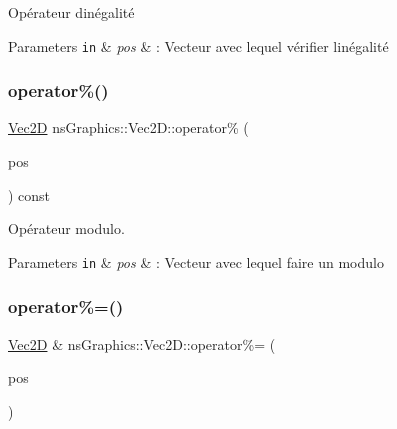 Opérateur d\textquotesingle{}inégalité 


\begin{DoxyParams}[1]{Parameters}
\mbox{\tt in}  & {\em pos} & \+: Vecteur avec lequel vérifier l\textquotesingle{}inégalité \\
\hline
\end{DoxyParams}
\mbox{\label{classns_graphics_1_1_vec2_d_a43281403abbad9948eacca4d37fc61dc}} 
\subsubsection{\texorpdfstring{operator\%()}{operator\%()}}
{\footnotesize\ttfamily \hyperlink{classns_graphics_1_1_vec2_d}{Vec2D} ns\+Graphics\+::\+Vec2\+D\+::operator\% (\begin{DoxyParamCaption}\item[{const \hyperlink{classns_graphics_1_1_vec2_d}{Vec2D} \&}]{pos }\end{DoxyParamCaption}) const}



Opérateur modulo. 


\begin{DoxyParams}[1]{Parameters}
\mbox{\tt in}  & {\em pos} & \+: Vecteur avec lequel faire un modulo \\
\hline
\end{DoxyParams}
\mbox{\label{classns_graphics_1_1_vec2_d_a57003f3d4660f986c3c21c027ac8b154}} 
\subsubsection{\texorpdfstring{operator\%=()}{operator\%=()}}
{\footnotesize\ttfamily \hyperlink{classns_graphics_1_1_vec2_d}{Vec2D} \& ns\+Graphics\+::\+Vec2\+D\+::operator\%= (\begin{DoxyParamCaption}\item[{const \hyperlink{classns_graphics_1_1_vec2_d}{Vec2D} \&}]{pos }\end{DoxyParamCaption})}



